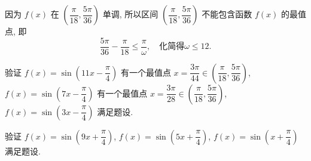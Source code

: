 \begin{solutions}
因为 $ f(x) $ 在 $ \left(\dfrac{\pi}{18},\dfrac{5\pi}{36}\right) $ 单调, 所以区间 $ \left(\dfrac{\pi}{18},\dfrac{5\pi}{36}\right) $ 不能包含函数 $ f(x) $ 的最值点, 即  
$$
\dfrac{5\pi}{36}-\dfrac{\pi}{18}\leqslant\dfrac{\pi}{\omega},\quad\text{化简得}\omega\leqslant12.
$$  

验证 $ f(x)=\sin\left(11x-\dfrac{\pi}{4}\right) $ 有一个最值点 $ x=\dfrac{3\pi}{44}\in\left(\dfrac{\pi}{18},\dfrac{5\pi}{36}\right) $, $ f(x)=\sin\left(7x-\dfrac{\pi}{4}\right) $ 有一个最值点 $ x=\dfrac{3\pi}{28}\in\left(\dfrac{\pi}{18},\dfrac{5\pi}{36}\right) $, $ f(x)=\sin\left(3x-\dfrac{\pi}{4}\right) $ 满足题设.  

验证 $ f(x)=\sin\left(9x+\dfrac{\pi}{4}\right) $, $ f(x)=\sin\left(5x+\dfrac{\pi}{4}\right) $, $ f(x)=\sin\left(x+\dfrac{\pi}{4}\right) $ 满足题设.
\end{solutions}